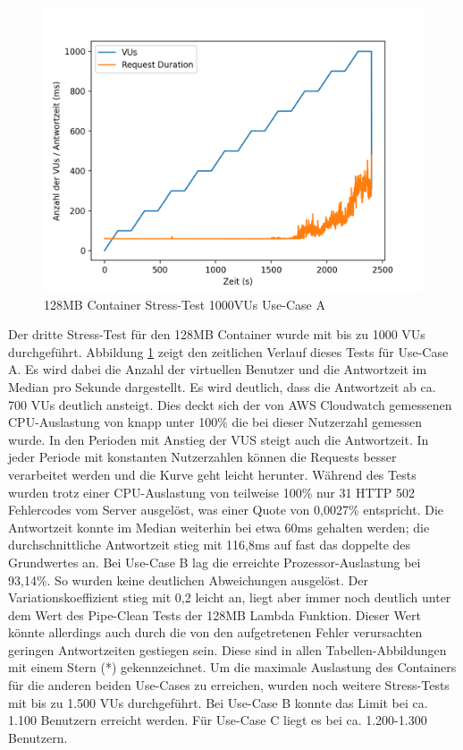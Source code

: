 \begin{figure}[H]
    \includegraphics[width=\textwidth]{img/fargate128-stress1000.png}
    \caption[Container Stress-Test 1000VUs]{128MB Container Stress-Test 1000VUs Use-Case A}
    \label{fig:fargate128-stress1000}
\end{figure}

Der dritte Stress-Test für den 128MB Container wurde mit bis zu 1000 VUs durchgeführt. Abbildung \ref{fig:fargate128-stress1000} zeigt den zeitlichen Verlauf dieses Tests für Use-Case A. Es wird dabei die Anzahl der virtuellen Benutzer und die Antwortzeit im Median pro Sekunde dargestellt. Es wird deutlich, dass die Antwortzeit ab ca. 700 VUs deutlich ansteigt. Dies deckt sich der von AWS Cloudwatch gemessenen CPU-Auslastung von knapp unter 100\% die bei dieser Nutzerzahl gemessen wurde. In den Perioden mit Anstieg der VUS steigt auch die Antwortzeit. In jeder Periode mit konstanten Nutzerzahlen können die Requests besser verarbeitet werden und die Kurve geht leicht herunter. Während des Tests wurden trotz einer CPU-Auslastung von teilweise 100\% nur 31 HTTP 502 Fehlercodes vom Server ausgelöst, was einer Quote von 0,0027\% entspricht. Die Antwortzeit konnte im Median weiterhin bei etwa 60ms gehalten werden; die durchschnittliche Antwortzeit stieg mit 116,8ms auf fast das doppelte des Grundwertes an.  
Bei Use-Case B lag die erreichte Prozessor-Auslastung bei 93,14\%. So wurden keine deutlichen Abweichungen ausgelöst. Der Variationskoeffizient stieg mit 0,2 leicht an, liegt aber immer noch deutlich unter dem Wert des Pipe-Clean Tests der 128MB Lambda Funktion. Dieser Wert könnte allerdings auch durch die von den aufgetretenen Fehler verursachten geringen Antwortzeiten gestiegen sein. Diese sind in allen Tabellen-Abbildungen mit einem Stern (*) gekennzeichnet.
Um die maximale Auslastung des Containers für die anderen beiden Use-Cases zu erreichen, wurden noch weitere Stress-Tests mit bis zu 1.500 VUs durchgeführt. Bei Use-Case B konnte das Limit bei ca. 1.100 Benutzern erreicht werden. Für Use-Case C liegt es bei ca. 1.200-1.300 Benutzern.

